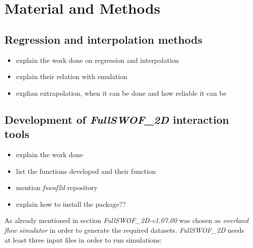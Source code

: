 \chapter{Material and Methods}
\label{chp:material_methods}

\section{Regression and interpolation methods}

\begin{itemize}
\itemsep0em
  \item explain the work done on regression and interpolation
  \item explain their relation with emulation
  \item explian extrapolation, when it can be done and how reliable it can be
\end{itemize}


\section{Development of \textit{FullSWOF\_2D} interaction tools}

\begin{itemize}
\itemsep0em
  \item explain the work done
  \item list the functions developed and their function
  \item mention \textit{fswof2d} repository
  \item explain how to install the package?? 
\end{itemize}

As already mentioned in section  \textit{FullSWOF\_2D-v1.07.00} was chosen as \emph{overland flow simulator} in order to generate the required datasets.
\textit{FullSWOF\_2D} needs at least three input files in order to run simulations:

